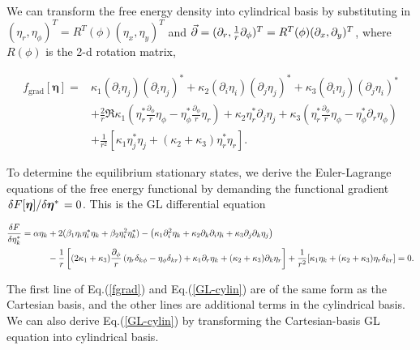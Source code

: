\documentclass[aps,prb,reprint,groupedaddress]{revtex4-2}
\begin{document}
We can transform the free energy density into cylindrical basis by substituting in
$(\eta_r,\eta_\phi)^T=R^T(\phi)(\eta_x,\eta_y)^T$ and
$\va{\partial}=(\partial_r,\frac{1}{r}\partial_\phi)^T=R^T(\phi)(\partial_x,\partial_y)^T$,
where $R(\phi)$ is the 2-d rotation matrix\cite{Buchholtz77},

\begin{widetext}
    \begin{align}
        f_{\text{grad}}[\bm{\eta}]= & \kappa_1(\partial_i\eta_j)(\partial_i\eta_j)^*
        +\kappa_2(\partial_i\eta_i)(\partial_j\eta_j)^*
        +\kappa_3(\partial_i\eta_j)(\partial_j\eta_i)^*\nonumber                     \\
                                    & +\frac{2}{r}\Re{
            \kappa_1\left(\eta_r^*\frac{\partial_\phi}{r}\eta_\phi
            -\eta_\phi^*\frac{\partial_\phi}{r}\eta_r\right)
            +\kappa_2\eta_r^*\partial_j\eta_j
            +\kappa_3\left(\eta_r^*\frac{\partial_\phi}{r}\eta_\phi
        -\eta_\phi^*\partial_r\eta_\phi\right)}\label{fgrad}                         \\
                                    & +\frac{1}{r^2}\left[\kappa_1\eta^*_j\eta_j
            +(\kappa_2+\kappa_3)\eta_r^*\eta_r\right].\nonumber
    \end{align}
\end{widetext}

To determine the equilibrium stationary states, we derive the Euler-Lagrange
equations of the free energy functional by demanding the functional gradient
$\fdv*{F[\bm{\eta}]}{\bm{\eta}^*}=0$. This is the GL differential equation
\begin{widetext}
    \begin{align}\label{GL-cylin}
        \fdv{F}{\eta_k^*}=\alpha\eta_k
         & +2(\beta_1\eta_i\eta_i^*\eta_k
        +\beta_2\eta_i^2\eta_k^*)-\left(\kappa_1\partial_i^2\eta_k
        +\kappa_2\partial_k\partial_i\eta_i
        +\kappa_3\partial_j\partial_k\eta_j\right)\nonumber              \\
         & -\frac{1}{r}\left[(2\kappa_1+\kappa_3)\frac{\partial_\phi}{r}
            \left(\eta_r\delta_{k\phi}-\eta_\phi\delta_{kr}\right)+\kappa_1\partial_r\eta_k
            +(\kappa_2+\kappa_3)\partial_k\eta_r\right]
        +\frac{1}{r^2}[\kappa_1\eta_k+(\kappa_2+\kappa_3)\eta_r\delta_{kr}]
        =0.
    \end{align}
\end{widetext}
The first line of Eq.(\ref{fgrad}) and Eq.(\ref{GL-cylin}) are of the same form
as the Cartesian basis, and the other lines are additional terms in the cylindrical
basis. We can also derive Eq.(\ref{GL-cylin}) by transforming the Cartesian-basis
GL equation into cylindrical basis.
\end{document}
